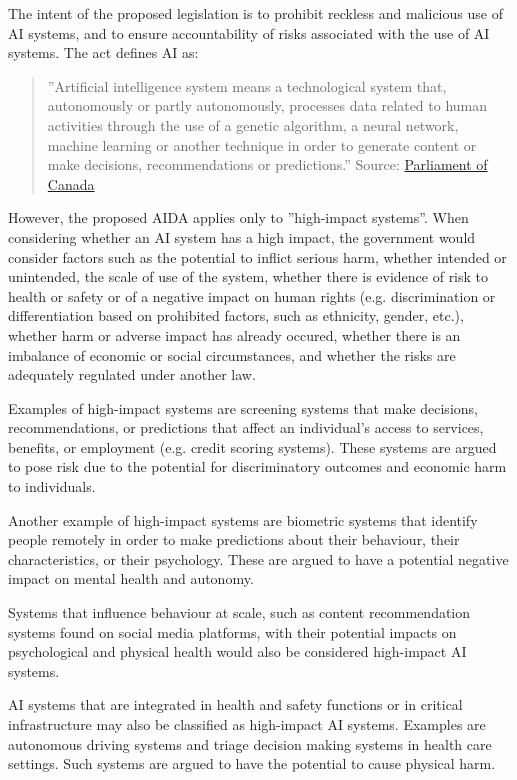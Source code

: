 The intent of the proposed legislation is to prohibit reckless and malicious use of AI systems, and to ensure accountability of risks associated with the use of AI systems. The act defines AI as:

\begin{quote}''Artificial intelligence system means a technological system that, autonomously or partly autonomously, processes data related to human activities through the use of a genetic algorithm, a neural network, machine learning or another technique in order to generate content or make decisions, recommendations or predictions.'' \footnotesize Source: \href{https://www.parl.ca/legisinfo/en/bill/44-1/c-27}{Parliament of Canada} \normalsize \end{quote}

However, the proposed AIDA applies only to ''high-impact systems''. When considering whether an AI system has a high impact, the government would consider factors such as the potential to inflict serious harm, whether intended or unintended, the scale of use of the system, whether there is evidence of risk to health or safety or of a negative impact on human rights (e.g. discrimination or differentiation based on prohibited factors, such as ethnicity, gender, etc.), whether harm or adverse impact has already occured, whether there is an imbalance of economic or social circumstances, and whether the risks are adequately regulated under another law. 

Examples of high-impact systems are screening systems that make decisions, recommendations, or predictions that affect an individual's access to services, benefits, or employment (e.g. credit scoring systems). These systems are argued to pose risk due to the potential for discriminatory outcomes and economic harm to individuals. 

Another example of high-impact systems are biometric systems that identify people remotely in order to make predictions about their behaviour, their characteristics, or their psychology. These are argued to have a potential negative impact on mental health and autonomy. 

Systems that influence behaviour at scale, such as content recommendation systems found on social media platforms, with their potential impacts on psychological and physical health would also be considered high-impact AI systems. 

AI systems that are integrated in health and safety functions or in critical infrastructure may also be classified as high-impact AI systems. Examples are autonomous driving systems and triage decision making systems in health care settings. Such systems are argued to have the potential to cause physical harm. 

